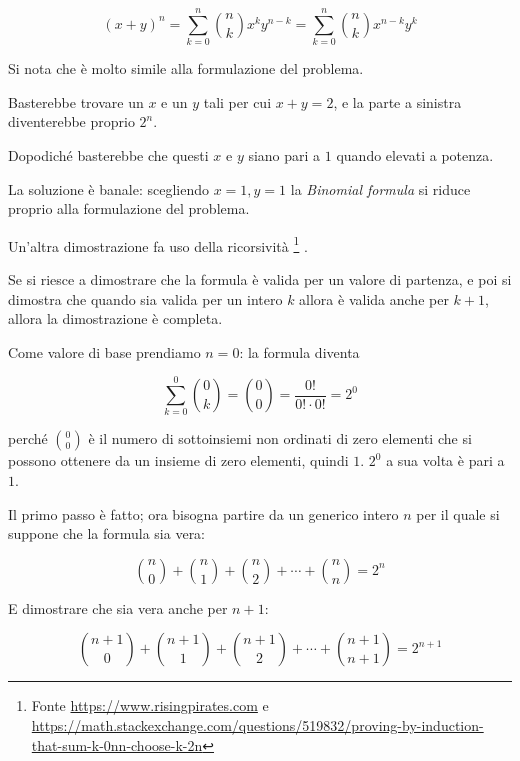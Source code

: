 \begin{equation}
(x+y)^n=\sum_{k=0}^{n}{\binom{n}{k}x^{k}y^{n-k}}
=\sum_{k=0}^{n}{\binom{n}{k}x^{n-k}y^{k}}
\end{equation}

Si nota che è molto simile alla formulazione del problema.

Basterebbe trovare un $x$ e un $y$ tali per cui $x+y=2$, e la parte a sinistra diventerebbe proprio $2^n$.

Dopodiché basterebbe che questi $x$ e $y$ siano pari a $1$ quando elevati a potenza.

La soluzione è banale: scegliendo $x=1, y=1$ la \emph{Binomial formula} si riduce proprio alla formulazione del problema.

\vspace{1cm}

Un'altra dimostrazione fa uso della ricorsività
\footnote{Fonte 
\href{https://www.risingpirates.com}{https://www.risingpirates.com}
e
\href{https://math.stackexchange.com/questions/519832/proving-by-induction-that-sum-k-0nn-choose-k-2n}
{https://math.stackexchange.com/questions/519832/proving-by-induction-that-sum-k-0nn-choose-k-2n}
}
.


Se si riesce a dimostrare che la formula è valida per un valore di partenza, e poi si dimostra che quando sia valida per un intero $k$ allora è valida anche per $k+1$, allora la dimostrazione è completa.

Come valore di base prendiamo $n=0$: la formula diventa 

\begin{equation*}
\sum_{k=0}^{0}{\binom{0}{k}}=\binom{0}{0}=\frac{0!}{0!\cdot0!}=2^0
\end{equation*}

perché ${0 \choose 0}$ è il numero di sottoinsiemi non ordinati di zero elementi che si possono ottenere da un insieme di zero elementi, quindi $1$.  $2^0$ a sua volta è pari a $1$.

Il primo passo è fatto; ora bisogna partire da un generico intero $n$ per il quale si suppone che la formula sia vera:

\begin{equation*}
\binom{n}{0} + \binom{n}{1} + \binom{n}{2} + \cdots + \binom{n}{n} = 2^n
\end{equation*}

E dimostrare che sia vera anche per $n+1$:


\begin{equation}\label{expr4}
\binom{n+1}{0} + \binom{n+1}{1} + \binom{n+1}{2} + \cdots + \binom{n+1}{n+1} = 2^{n+1}
\end{equation}

